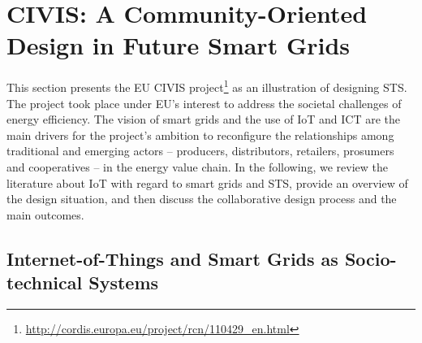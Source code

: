 \section{CIVIS: A Community-Oriented Design in Future Smart Grids}
\label{sec:civis}

This section presents the EU CIVIS project\footnote{\url{http://cordis.europa.eu/project/rcn/110429\_en.html}} as an illustration of designing STS.  The project took place under EU's interest to address the societal challenges of energy efficiency. The vision of smart grids and the use of IoT and ICT are 
the main drivers for the project's ambition to reconfigure the relationships among traditional and 
emerging actors -- producers, distributors, retailers, 
prosumers and cooperatives -- in the energy value chain.
In the following, we review the literature about IoT with regard to smart grids and STS,
provide an overview of the design situation, and then discuss
the collaborative design process and the main outcomes.  

\subsection{Internet-of-Things and Smart Grids as Socio-technical Systems}
\label{sec:IoT_socio-techical}



